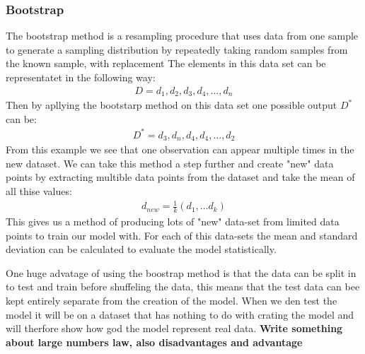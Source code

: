 \subsubsection{Bootstrap} 
\noindent The bootstrap method is a resampling procedure that uses data from one 
sample to generate a sampling distribution by repeatedly taking random 
samples from the known sample, with replacement %
The elements in this data set can be representatet in the following way:
\begin{align}
    D = {d_1, d_2, d_3, d_4, \dots, d_n}
\end{align}
Then by apllying the bootstarp method on this data set one possible output $D^{*}$ can be:
\begin{align}
    D^{*} = {d_3, d_n, d_4, d_4 , \dots, d_2}
\end{align}
From this example we see that one observation can appear multiple times in the new dataset.
We can take this method a step further and create "new" data points by extracting multible data points from 
the dataset and take the mean of all thise values:
\begin{align}
    d_{new} = \frac{1}{k}(d_1, \dots d_k)
\end{align}
This gives us a method of producing lots of "new" data-set from 
limited data points to train our model with. For each of this data-sets
the mean and standard deviation can be calculated to evaluate the model statistically. %


One huge advatage of using the boostrap method is that the data can be split in to 
test and train before shuffeling the data, this means that the test data can bee kept 
entirely separate from the creation of the model. When we den test the model it will
be on a dataset that has nothing to do with crating the model and will therfore show
how god the model represent real data. 
\textbf{Write something about large numbers law, also disadvantages and advantage}


